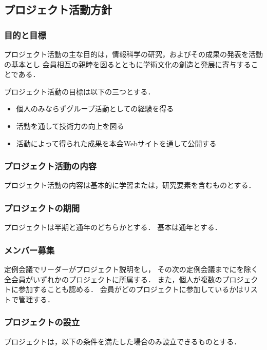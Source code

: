 \subsection*{プロジェクト活動方針}


\subsubsection*{目的と目標}
プロジェクト活動の主な目的は，情報科学の研究，およびその成果の発表を活動の基本とし
会員相互の親睦を図るとともに学術文化の創造と発展に寄与することである．

プロジェクト活動の目標は以下の三つとする．

\begin{itemize}
\item 個人のみならずグループ活動としての経験を得る
\item 活動を通して技術力の向上を図る
\item 活動によって得られた成果を本会Webサイトを通して公開する
\end{itemize}

\subsubsection*{プロジェクト活動の内容}
プロジェクト活動の内容は基本的に学習または，研究要素を含むものとする．

\subsubsection*{プロジェクトの期間}
プロジェクトは半期と通年のどちらかとする．
基本は通年とする．

\subsubsection*{メンバー募集}
定例会議でリーダーがプロジェクト説明をし，
その次の定例会議までに\fourthGrade{}を除く全会員がいずれかのプロジェクトに所属する．
また，個人が複数のプロジェクトに参加することも認める．
会員がどのプロジェクトに参加しているかはリストで管理する．

\subsubsection*{プロジェクトの設立}
プロジェクトは，以下の条件を満たした場合のみ設立できるものとする．

